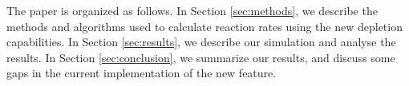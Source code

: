     The paper is organized as follows. In Section \ref{sec:methods}, we describe
    the methods and algorithms used to calculate reaction rates using the new
    depletion capabilities. In Section \ref{sec:results}, we describe our
    simulation and analyse the results. In Section \ref{sec:conclusion}, we
    summarize our results, and discuss some gaps in the current implementation
    of the new feature.


